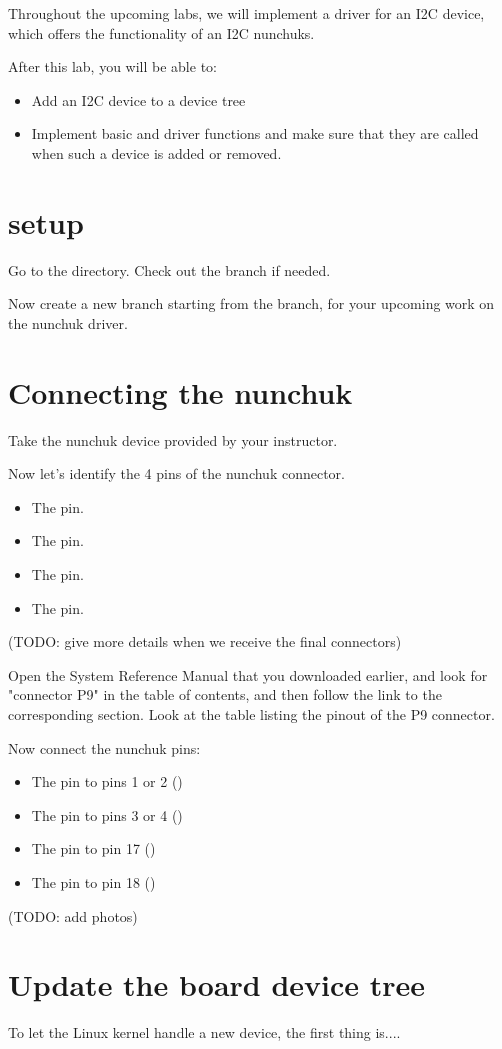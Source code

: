 
Throughout the upcoming labs, we will implement a driver for an I2C
device, which offers the functionality of an I2C nunchuks.

After this lab, you will be able to:

\begin{itemize}
\item Add an I2C device to a device tree
\item Implement basic  and  driver
functions and make sure that they are called when such a device is added or removed.
\end{itemize}

\section{setup}

Go to the  directory. Check out the
 branch if needed. 

Now create a new  branch starting from the
 branch,  for your upcoming work on the nunchuk
driver.  

\section{Connecting the nunchuk}

Take the nunchuk device provided by your instructor.

Now let's identify the 4 pins of the nunchuk connector.

\begin{itemize}
\item The  pin.
\item The  pin.
\item The  pin.
\item The  pin.
\end{itemize}

(TODO: give more details when we receive the final connectors)

Open the System Reference Manual that you downloaded earlier,
and look for "connector P9" in the table of contents, and then
follow the link to the corresponding section. Look at the table listing
the pinout of the P9 connector.

Now connect the nunchuk pins:
\begin{itemize}
\item The  pin to pins 1 or 2 ()
\item The  pin to pins 3 or 4 ()
\item The  pin to pin 17 ()
\item The  pin to pin 18 ()
\end{itemize}

(TODO: add photos)

\section{Update the board device tree}

To let the Linux kernel handle a new device, the first thing is....



